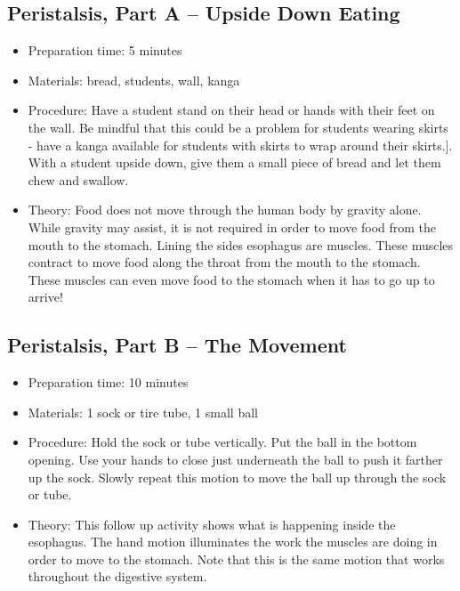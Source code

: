\subsection{Peristalsis, Part A – Upside Down Eating}
\begin{itemize}
\item{Preparation time: 5 minutes}
\item{Materials: bread, students, wall, kanga}
\item{Procedure: Have a student stand on their head or hands with their feet on the wall. Be mindful that this could be a problem for students wearing skirts - have a kanga available for students with skirts to wrap around their skirts.]. With a student upside down, give them a small piece of bread and let them chew and swallow.}
\item{Theory: Food does not move through the human body by gravity alone. While gravity may assist, it is not required in order to move food from the mouth to the stomach. Lining the sides esophagus are muscles. These muscles contract to move food along the throat from the mouth to the stomach. These muscles can even move food to the stomach when it has to go up to arrive!}
\end{itemize}

\subsection{Peristalsis, Part B – The Movement}
\begin{itemize}
\item{Preparation time: 10 minutes}
\item{Materials: 1 sock or tire tube, 1 small ball}
\item{Procedure: Hold the sock or tube vertically. Put the ball in the bottom opening. Use your hands to close just underneath the ball to push it farther up the sock. Slowly repeat this motion to move the ball up through the sock or tube.}
\item{Theory: This follow up activity shows what is happening inside the esophagus. The hand motion illuminates the work the muscles are doing in order to move to the stomach. Note that this is the same motion that works throughout the digestive system.}
\end{itemize}


